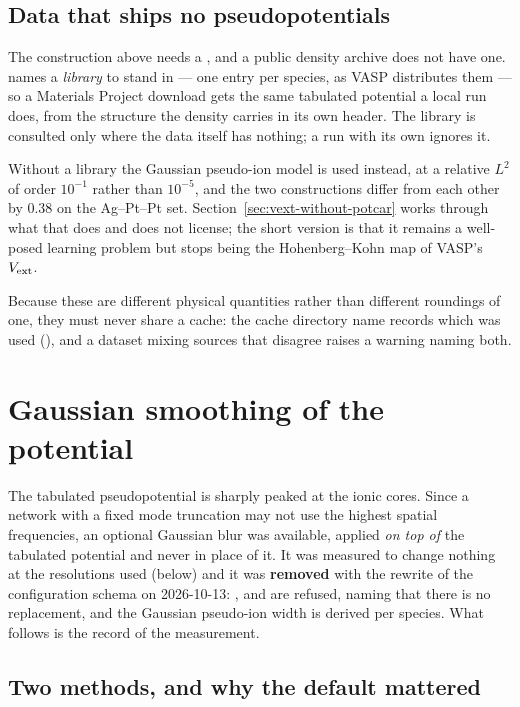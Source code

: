 \subsection{Data that ships no pseudopotentials}

The construction above needs a , and a public density archive does
not have one.  names a  \emph{library} to
stand in --- one entry per species, as VASP distributes them --- so a Materials
Project download gets the same tabulated potential a local run does, from the
structure the density carries in its own header. The library is consulted only
where the data itself has nothing; a run with its own  ignores it.

Without a library the Gaussian pseudo-ion model is used instead, at a relative
$L^2$ of order $10^{-1}$ rather than $10^{-5}$, and the two constructions differ
from each other by $0.38$ on the Ag--Pt--Pt set.
Section~\ref{sec:vext-without-potcar} works through what that does and does not
license; the short version is that it remains a well-posed learning problem but
stops being the Hohenberg--Kohn map of VASP's $V_{\mathrm{ext}}$.

Because these are different physical quantities rather than different roundings
of one, they must never share a cache: the cache directory name records which
was used (), and a dataset mixing sources that disagree
raises a warning naming both.

\section{Gaussian smoothing of the potential}
\label{sec:smoothing}

The tabulated pseudopotential is sharply peaked at the ionic cores. Since a
network with a fixed mode truncation may not use the highest spatial
frequencies, an optional Gaussian blur was available, applied \emph{on top of}
the tabulated potential and never in place of it. It was measured to change
nothing at the resolutions used (below) and it was \textbf{removed} with the
rewrite of the configuration schema on 2026-10-13: ,
 and  are refused, naming that there is
no replacement, and the Gaussian pseudo-ion width is derived per species. What
follows is the record of the measurement.

\subsection{Two methods, and why the default mattered}

